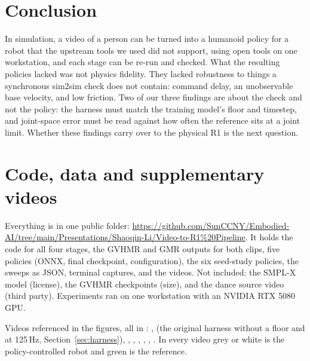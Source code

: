 \documentclass[11pt]{article}
\begin{document}
\section{Conclusion}
In simulation, a video of a person can be turned into a humanoid policy for a robot that the upstream tools we used did not support, using open tools on one workstation, and each stage can be re-run and checked. What the resulting policies lacked was not physics fidelity. They lacked robustness to things a synchronous sim2sim check does not contain: command delay, an unobservable base velocity, and low friction. Two of our three findings are about the check and not the policy: the harness must match the training model's floor and timestep, and joint-space error must be read against how often the reference sits at a joint limit. Whether these findings carry over to the physical R1 is the next question.

\section*{Code, data and supplementary videos}
Everything is in one public folder: \url{https://github.com/SunCCNY/Embodied-AI/tree/main/Presentations/Shaoqin-Li/Video-to-R1\%20Pipeline}. It holds the code for all four stages, the GVHMR and GMR outputs for both clips, five policies (ONNX, final checkpoint, configuration), the six seed-study policies, the sweeps as JSON, terminal captures, and the videos. Not included: the SMPL-X model (license), the GVHMR checkpoints (size), and the dance source video (third party). Experiments ran on one workstation with an NVIDIA RTX 5080 GPU.

Videos referenced in the figures, all in : ,  (the original harness without a floor and at 125\,Hz, Section~\ref{sec:harness}), , , , , , . In every video grey or white is the policy-controlled robot and green is the reference.
\end{document}
